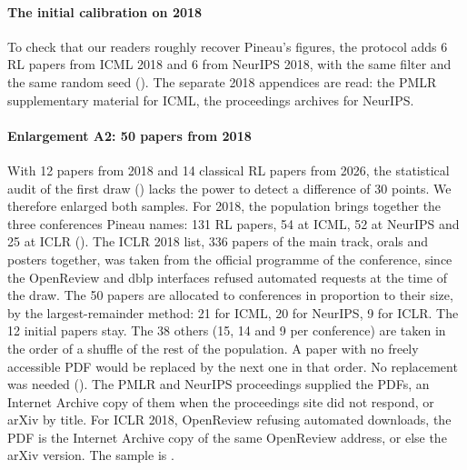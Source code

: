 \paragraph{The initial calibration on 2018}
To check that our readers roughly recover Pineau's figures, the protocol adds 6 RL papers from ICML
2018 and 6 from NeurIPS 2018, with the same filter and the same random seed
(). The separate 2018 appendices are read: the PMLR supplementary material
for ICML, the proceedings archives for NeurIPS.

\paragraph{Enlargement A2: 50 papers from 2018}
With 12 papers from 2018 and 14 classical RL papers from 2026, the statistical audit of the first draw
() lacks the power to detect a difference of 30 points. We therefore enlarged
both samples. For
2018, the population brings together the three conferences Pineau names: 131 RL papers, 54 at ICML, 52
at NeurIPS and 25 at ICLR (). The ICLR 2018 list, 336 papers of
the main track, orals and posters together, was taken from the official programme of the conference,
since the OpenReview and dblp interfaces refused automated requests at the time of the draw. The 50 papers
are allocated to conferences in proportion to their size, by the largest-remainder method: 21 for
ICML, 20 for NeurIPS, 9 for ICLR. The 12 initial papers stay. The 38 others (15, 14 and 9 per
conference) are taken in the order of a  shuffle of the rest of the
population. A paper with no freely accessible PDF would be replaced by the next one in that order. No
replacement was needed (). The PMLR and NeurIPS proceedings
supplied the PDFs, an Internet Archive copy of them when the proceedings site did not respond, or arXiv
by title. For ICLR 2018, OpenReview refusing automated downloads, the PDF is the Internet Archive
copy of the same OpenReview address, or else the arXiv version. The sample is
.

